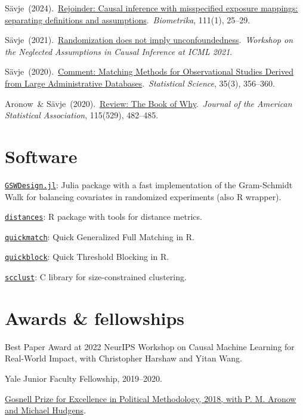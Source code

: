 \documentclass[10pt,letterpaper]{article}
\newenvironment{infolist}{
	\begin{list}{}{
		\setlength{\parskip}{0pt}
		\setlength{\itemsep}{4pt}
		\setlength{\parsep}{0.3em}
		\setlength{\leftmargin}{0em}
		\setlength{\labelwidth}{0em}
		}
	}{
\end{list}
}
\newcommand{\infoitem}[1]{\item {#1}}
\begin{document}
	\begin{infolist}
		\infoitem{Sävje\ (2024).\ \href{https://doi.org/10.1093/biomet/asad071}{Rejoinder: Causal inference with misspecified exposure mappings: separating definitions and assumptions}.\ \textit{Biometrika}, 111(1), 25--29.}
		\infoitem{Sävje\ (2021).\ \href{https://arxiv.org/abs/2107.14197}{Randomization does not imply unconfoundedness}.\ \textit{Workshop on the Neglected Assumptions in Causal Inference at ICML 2021}.}
		\infoitem{Sävje\ (2020).\ \href{https://projecteuclid.org/journals/statistical-science/volume-35/issue-3/Comment--Matching-Methods-for-Observational-Studies-Derived-from-Large/10.1214/19-STS739.short}{Comment: Matching Methods for Observational Studies Derived from Large Administrative Databases}.\ \textit{Statistical Science}, 35(3), 356--360.}
		\infoitem{Aronow\ \& Sävje\ (2020).\ \href{https://www.tandfonline.com/doi/full/10.1080/01621459.2020.1721245}{Review: The Book of Why}.\ \textit{Journal of the American Statistical Association}, 115(529), 482--485.}
	\end{infolist}


	\section*{Software}

	\begin{infolist}
		\infoitem{\href{https://github.com/crharshaw/GSWDesign.jl}{\texttt{GSWDesign.jl}}: Julia package with a fast implementation of the Gram-Schmidt Walk for balancing covariates in randomized experiments (also R wrapper).}
		\infoitem{\href{https://github.com/fsavje/distances}{\texttt{distances}}: R package with tools for distance metrics.}
		\infoitem{\href{https://github.com/fsavje/quickmatch}{\texttt{quickmatch}}: Quick Generalized Full Matching in R.}
		\infoitem{\href{https://github.com/fsavje/quickblock}{\texttt{quickblock}}: Quick Threshold Blocking in R.}
		\infoitem{\href{https://github.com/fsavje/scclust}{\texttt{scclust}}: C library for size-constrained clustering.}
	\end{infolist}


	\section*{Awards \& fellowships}

	\begin{infolist}
		\infoitem{Best Paper Award at 2022 NeurIPS Workshop on Causal Machine Learning for Real-World Impact, with Christopher Harshaw and Yitan Wang.}
		\infoitem{Yale Junior Faculty Fellowship, 2019--2020.}
		\infoitem{\href{https://www.cambridge.org/core/membership/spm/about-us/awards/the-gosnell-prize}{Gosnell Prize for Excellence in Political Methodology, 2018, with P. M. Aronow and Michael Hudgens}.}
	\end{infolist}
\end{document}
